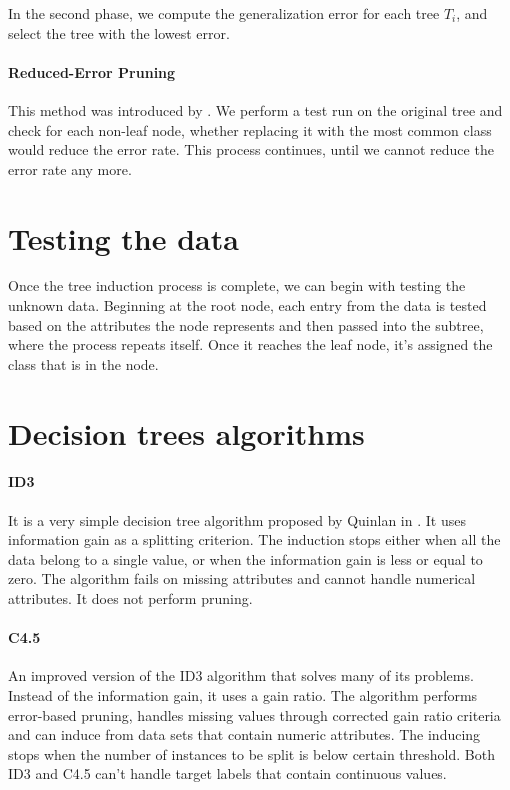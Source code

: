 \documentclass[thesis=B,english]{FITthesis}[2012/10/20]
\begin{document}
				In the second phase, we compute the generalization error for each tree \(T_i\), and select the tree with the lowest error. 

				\paragraph*{Reduced-Error Pruning}

				This method was introduced by \cite{Quinlan1987221}. We perform a test run on the original tree and check for each non-leaf node, whether replacing it with the most common class would reduce the error rate. This process continues, until we cannot reduce the error rate any more.

		\section{Testing the data}
		Once the tree induction process is complete, we can begin with testing the unknown data. Beginning at the root node, each entry from the data is tested based on the attributes the node represents and then passed into the subtree, where the process repeats itself. Once it reaches the leaf node, it's assigned the class that is in the node.
		
		\section{Decision trees algorithms}
			\paragraph*{ID3} It is a very simple decision tree algorithm proposed by Quinlan in \cite{INDUCTIONOFDT}. It uses information gain as a splitting criterion. The induction stops either when all the data belong to a single value, or when the information gain is less or equal to zero. The algorithm fails on missing attributes and cannot handle numerical attributes. It does not perform pruning.

			\paragraph*{C4.5} An improved version of the ID3 algorithm \cite{C45-NUMERICAL} that solves many of its problems. Instead of the information gain, it uses a gain ratio. The algorithm performs error-based pruning, handles missing values through corrected gain ratio criteria and can induce from data sets that contain numeric attributes. The inducing stops when the number of instances to be split is below certain threshold. Both ID3 and C4.5 can't handle target labels that contain continuous values.
\end{document}
